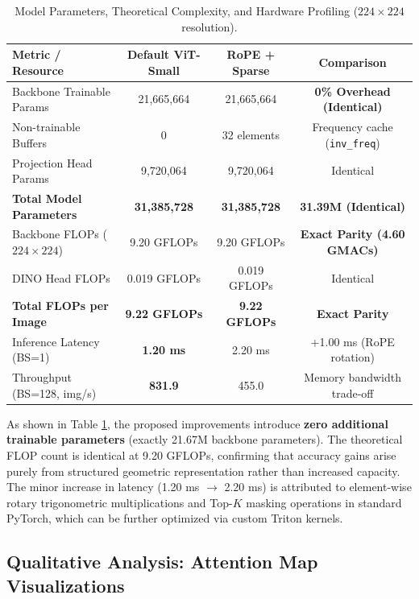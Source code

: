 \documentclass[11pt,a4paper]{article}
\begin{document}
\begin{table}[ht]
\centering
\small
\caption{Model Parameters, Theoretical Complexity, and Hardware Profiling ($224 \times 224$ resolution).}
\label{tab:profiling}
\begin{tabular}{lccc}
\toprule
\textbf{Metric / Resource} & \textbf{Default ViT-Small} & \textbf{RoPE + Sparse} & \textbf{Comparison} \\
\midrule
Backbone Trainable Params & 21,665,664 & 21,665,664 & \textbf{0\% Overhead (Identical)} \\
Non-trainable Buffers & 0 & 32 elements & Frequency cache (\texttt{inv\_freq}) \\
Projection Head Params & 9,720,064 & 9,720,064 & Identical \\
\textbf{Total Model Parameters} & \textbf{31,385,728} & \textbf{31,385,728} & \textbf{31.39M (Identical)} \\
\midrule
Backbone FLOPs ($224\times 224$) & 9.20 GFLOPs & 9.20 GFLOPs & \textbf{Exact Parity (4.60 GMACs)} \\
DINO Head FLOPs & 0.019 GFLOPs & 0.019 GFLOPs & Identical \\
\textbf{Total FLOPs per Image} & \textbf{9.22 GFLOPs} & \textbf{9.22 GFLOPs} & \textbf{Exact Parity} \\
\midrule
Inference Latency (BS=1) & \textbf{1.20 ms} & 2.20 ms & +1.00 ms (RoPE rotation) \\
Throughput (BS=128, img/s) & \textbf{831.9} & 455.0 & Memory bandwidth trade-off \\
\bottomrule
\end{tabular}
\end{table}

As shown in Table \ref{tab:profiling}, the proposed improvements introduce \textbf{zero additional trainable parameters} (exactly 21.67M backbone parameters). The theoretical FLOP count is identical at 9.20 GFLOPs, confirming that accuracy gains arise purely from structured geometric representation rather than increased capacity. The minor increase in latency (1.20 ms $\to$ 2.20 ms) is attributed to element-wise rotary trigonometric multiplications and Top-$K$ masking operations in standard PyTorch, which can be further optimized via custom Triton kernels.

\subsection{Qualitative Analysis: Attention Map Visualizations}
\end{document}
